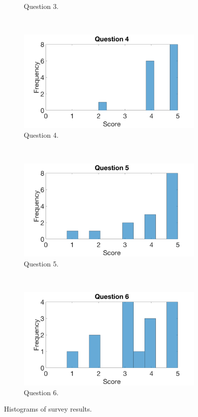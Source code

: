 \documentclass[main.tex]{subfiles}
\begin{document}
\begin{figure}[H]
\begin{subfigure}{.47\textwidth}
				\caption{Question 3.}
				\label{fig:survey3}
		\end{subfigure}
		~
		\begin{subfigure}{.47\textwidth}
				\includegraphics[width=\textwidth]{pics/q4}
				\caption{Question 4.}
				\label{fig:survey4}
		\end{subfigure}
		\\
		\begin{subfigure}{.47\textwidth}
				\includegraphics[width=\textwidth]{pics/q5}
				\caption{Question 5.}
				\label{fig:survey5}
		\end{subfigure}
		~
		\begin{subfigure}{.47\textwidth}
				\includegraphics[width=\textwidth]{pics/q6}
				\caption{Question 6.}
				\label{fig:survey6}
		\end{subfigure}
	\caption{Histograms of survey results.}
	\label{fig:survey}
\end{figure}
\end{document}
